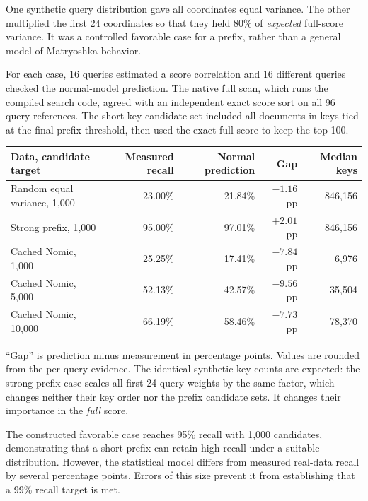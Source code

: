 One synthetic query distribution gave all coordinates equal variance. The other multiplied the
first 24 coordinates so that they held 80\% of \emph{expected} full-score variance. It was a
controlled favorable case for a prefix, rather than a general model of Matryoshka behavior.

For each case, 16 queries estimated a score correlation and 16 different queries checked the
normal-model prediction. The native full scan, which runs the compiled search code, agreed with an independent exact score sort on
all 96 query references. The short-key candidate set included all documents in keys tied at
the final prefix threshold, then used the exact full score to keep the top 100.

\begin{center}\small
\begin{tabular}{@{}lrrrr@{}}\toprule
Data, candidate target & Measured recall & Normal prediction & Gap & Median keys\\\midrule
Random equal variance, 1,000 & 23.00\% & 21.84\% & $-1.16$ pp & 846,156\\
Strong prefix, 1,000 & 95.00\% & 97.01\% & $+2.01$ pp & 846,156\\
Cached Nomic, 1,000 & 25.25\% & 17.41\% & $-7.84$ pp & 6,976\\
Cached Nomic, 5,000 & 52.13\% & 42.57\% & $-9.56$ pp & 35,504\\
Cached Nomic, 10,000 & 66.19\% & 58.46\% & $-7.73$ pp & 78,370\\\bottomrule
\end{tabular}\normalsize\end{center}
``Gap'' is prediction minus measurement in percentage points. Values are rounded from the
per-query evidence. The identical synthetic key counts are expected: the strong-prefix case
scales all first-24 query weights by the same factor, which changes neither their key order nor
the prefix candidate sets. It changes their importance in the \emph{full} score.

The constructed favorable case reaches 95\% recall with 1,000 candidates, demonstrating that
a short prefix can retain high recall under a suitable distribution. However, the statistical
model differs from measured real-data recall by several percentage points. Errors of this
size prevent it from establishing that a 99\% recall target is met.


